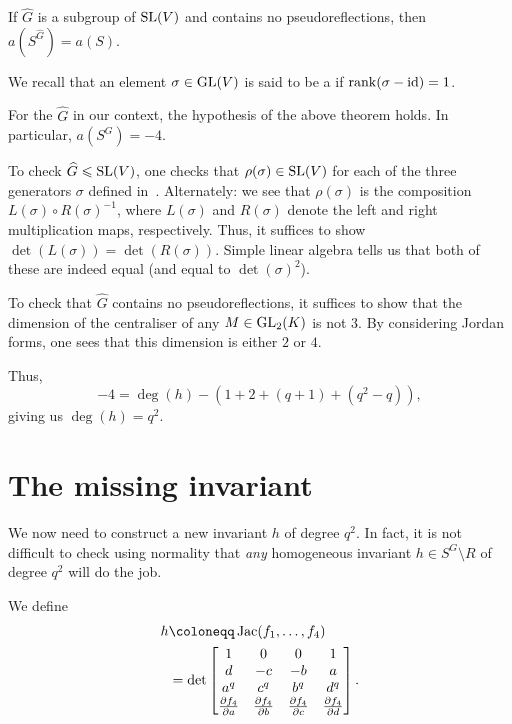\documentclass[12pt]{article}
\begin{document}
	\begin{thm}
		If $\widehat{G}$ is a subgroup of $\operatorname{SL}(V)$ and contains no pseudoreflections, then $a(S^{\widehat{G}}) = a(S)$.
	\end{thm}
	We recall that an element $\sigma \in \operatorname{GL}(V)$ is said to be a  if $\operatorname{rank}(\sigma - \operatorname{id}) = 1$.

	\begin{prop}
		For the $\widehat{G}$ in our context, the hypothesis of the above theorem holds. 
		In particular, $a(S^{G}) = -4$.
	\end{prop}
	\begin{sketch} 
		To check $\widehat{G} \leqslant \operatorname{SL}(V)$, one checks that $\rho(\sigma) \in \operatorname{SL}(V)$ for each of the three generators $\sigma$ defined in~. 
		Alternately: we see that $\rho(\sigma)$ is the composition $L(\sigma) \circ R(\sigma)^{-1}$, where $L(\sigma)$ and $R(\sigma)$ denote the left and right multiplication maps, respectively. 
		Thus, it suffices to show $\det(L(\sigma)) = \det(R(\sigma))$. 
		Simple linear algebra tells us that both of these are indeed equal (and equal to $\det(\sigma)^{2}$).

		To check that $\widehat{G}$ contains no pseudoreflections, it suffices to show that the dimension of the centraliser of any $M \in \operatorname{GL}_{2}(K)$ is not $3$. 
		By considering Jordan forms, one sees that this dimension is either $2$ or $4$.
	\end{sketch}

	Thus,
	\begin{equation*} 
		-4 = \deg(h) - (1 + 2 + (q+1) + (q^{2} - q)),
	\end{equation*}
	giving us $\deg(h) = q^{2}$.

\section{The missing invariant}
	
	We now need to construct a new invariant $h$ of degree $q^{2}$. 
	In fact, it is not difficult to check using normality that \emph{any} homogeneous invariant $h \in S^{G} \setminus R$ of degree $q^{2}$ will do the job.

	We define
	\begin{align} 
		h &\coloneqq \Jac(f_{1}, \ldots, f_{4}) \nonumber \\
		&= \det 
		\begin{bmatrix}
			1 & 0 & 0 & 1 \\
			d & -c & -b & a \\
			a^{q} & c^{q} & b^{q} & d^{q} \\
			\frac{\partial f_{4}}{\partial a} & \frac{\partial f_{4}}{\partial b} & \frac{\partial f_{4}}{\partial c} & \frac{\partial f_{4}}{\partial d} \\
		\end{bmatrix}.
		\label{eq:002}
	\end{align}
\end{document}
